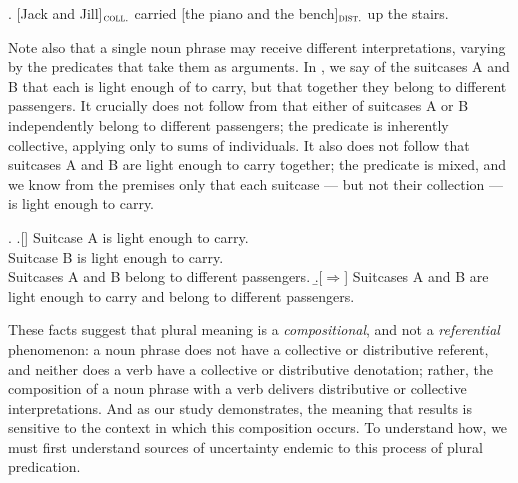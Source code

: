 \documentclass[linguex]{sp}
\newcommand{\op}{$\oplus$}
\begin{document}
\ex. [Jack and Jill]$_{\textsc{coll.}}$ carried [the piano and the bench]$_{\textsc{dist.}}$ up the stairs.

Note also that a single noun phrase may receive different interpretations, varying by the predicates that take them as arguments. In \Next, we say of the suitcases A and B that each is light enough of to carry, but that together they belong to different passengers. It crucially does not follow from \Next that either of suitcases A or B independently belong to different passengers; the predicate is inherently collective, applying only to sums of individuals. It also does not follow that suitcases A and B are light enough to carry together; the predicate is mixed, and we know from the premises only that each suitcase --- but not their collection --- is light enough to carry.

\ex. \a.[] Suitcase A is light enough to carry.\\
Suitcase B is light enough to carry.\\
Suitcases A and B belong to different passengers.
 \b.[$\Rightarrow$] Suitcases A and B are light enough to carry and belong to different passengers.
 \citep[ex.(3)]{schwarzschild1994}

These facts suggest that plural meaning is a \emph{compositional}, and not a \emph{referential} phenomenon: a noun phrase does not have a collective or distributive referent, and neither does a verb have a collective or distributive denotation; rather, the composition of a noun phrase with a verb delivers distributive or collective interpretations. And as our study demonstrates, the meaning that results is sensitive to the context in which this composition occurs. To understand how, we must first understand sources of uncertainty endemic to this process of plural predication.

\end{document}
